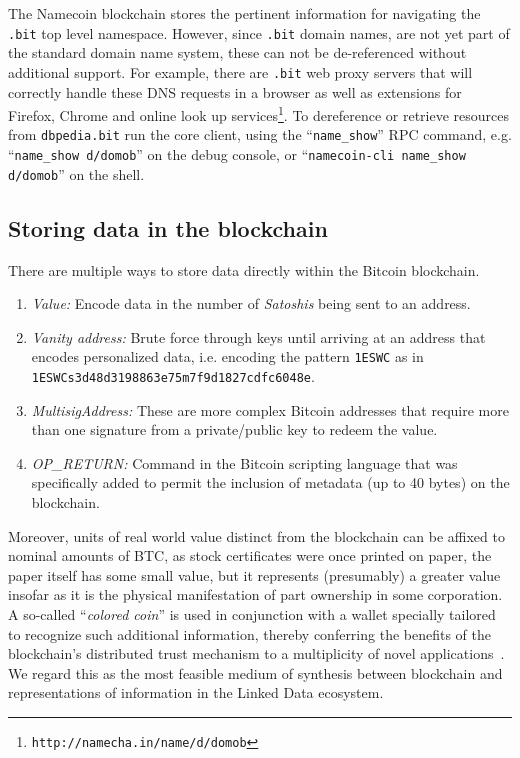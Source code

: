 The Namecoin blockchain stores the pertinent information for navigating the \texttt{.bit} top level namespace. However, since \texttt{.bit} domain names, are not yet part of the standard domain name system, these can not be de-referenced without additional support. For example, there are \texttt{.bit} web proxy servers that will correctly handle these DNS requests in a browser as well as extensions for Firefox, Chrome and online look up services\footnote{\footnotesize{\texttt{http://namecha.in/name/d/domob}}}.
To dereference or retrieve resources from \texttt{dbpedia.bit} run the core client, using the ``\texttt{name\_show}'' RPC command,  e.g. ``\texttt{name\_show d/domob}'' on the debug console, or ``\texttt{namecoin-cli name\_show d/domob}'' on the shell.

\subsection{Storing data in the blockchain}

There are multiple ways to store data directly within the Bitcoin blockchain. 

\begin{enumerate}
 \item \emph{Value:} Encode data in the number of \textit{Satoshis} being sent to an address.
 \item \emph{Vanity address:} Brute force through keys until arriving at an address that encodes personalized data, i.e. encoding the pattern \texttt{1ESWC} as in \\ \texttt{1ESWCs3d48d3198863e75m7f9d1827cdfc6048e}.
 \item \emph{MultisigAddress:} These are more complex Bitcoin addresses that require more than one signature from a private/public key to redeem the value.
 \item \emph{OP\_RETURN:} Command in the Bitcoin scripting language that was specifically added to permit the inclusion of metadata (up to 40 bytes) on the blockchain.
\end{enumerate}

Moreover, units of real world value distinct from the blockchain can be affixed to nominal amounts of BTC, as stock certificates were once printed on paper, the paper itself has some small value, but it represents (presumably) a greater value insofar as it is the physical manifestation of part ownership in some corporation. A so-called ``\textit{colored coin}'' is used in conjunction with a wallet specially tailored to recognize such additional information, thereby conferring the benefits of the blockchain's distributed trust mechanism to a multiplicity of novel applications~\cite{timswanson2014}. We regard this as the most feasible medium of synthesis between blockchain and representations of information in the Linked Data ecosystem.  

